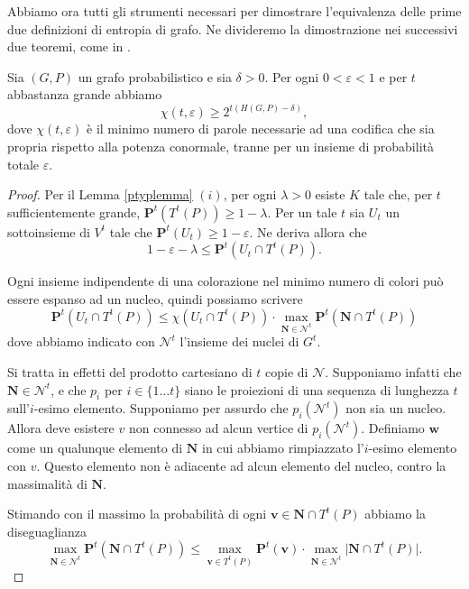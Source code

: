 Abbiamo ora tutti gli strumenti necessari per dimostrare l'equivalenza delle prime due definizioni di entropia di grafo. Ne divideremo la dimostrazione nei successivi due teoremi, come in \cite{Korner1973}. 
\begin{theorem}
  [K\"orner] Sia \((G,P)\) un grafo probabilistico e sia \(\delta>0\). Per ogni \(0<\varepsilon<1\) e per \(t\) abbastanza grande abbiamo
  \[\chi(t,\varepsilon)\ge 2^{t(H(G,P)-\delta)},\]
  dove \(\chi(t, \varepsilon)\) è il minimo numero di parole necessarie ad una codifica che sia propria rispetto alla potenza conormale, tranne per un insieme di probabilità totale \(\varepsilon\). 
\end{theorem}
\begin{proof}
  Per il Lemma \ref{ptyplemma} \((i)\), per ogni \(\lambda>0\) esiste \(K\) tale che, per \(t\) sufficientemente grande, \(\mathbf{P}^t(T^t(P))\ge 1-\lambda\). Per un tale \(t\) sia \(U_{t}\) un sottoinsieme di \(V^t\) tale che \(\mathbf{P}^t(U_{t})\ge 1-\varepsilon\). Ne deriva allora che 
  \begin{equation}
    \label{eq:epsilonlambda} 1-\varepsilon-\lambda\le \mathbf{P}^t(U_{t}\cap T^t(P)). 
  \end{equation}
  
  Ogni insieme indipendente di una colorazione nel minimo numero di colori può essere espanso ad un nucleo, quindi possiamo scrivere 
  \begin{equation}
    \label{eq:expansion} \mathbf{P}^t(U_{t}\cap T^t(P))\le \chi(U_{t}\cap T^t(P))\cdot\max_{\mathbf{N}\in \mathcal{N}^t} \mathbf{P}^t(\mathbf{N}\cap T^t(P)) 
  \end{equation}
  dove abbiamo indicato con \(\mathcal{N}^t\) l'insieme dei nuclei di \(G^t\).
	
  Si tratta in effetti del prodotto cartesiano di \(t\) copie di \(\mathcal{N}\). Supponiamo infatti che \(\mathbf{N}\in \mathcal{N}^t\), e che \(p_i\) per \(i\in\{1\dots t\}\) siano le proiezioni di una sequenza di lunghezza \(t\) sull'\(i\)-esimo elemento. Supponiamo per assurdo che \(p_i(\mathcal{N}^t)\) non sia un nucleo. Allora deve esistere \(v\) non connesso ad alcun vertice di \(p_i(\mathcal{N}^t)\). Definiamo \(\mathbf{w}\) come un qualunque elemento di \(\mathbf{N}\) in cui abbiamo rimpiazzato l'\(i\)-esimo elemento con \(v\). Questo elemento non è adiacente ad alcun elemento del nucleo, contro la massimalità di \(\mathbf{N}\).
  
  Stimando con il massimo la probabilità di ogni \(\mathbf{v}\in \mathbf{N}\cap T^{t}(P)\) abbiamo la diseguaglianza 
  \begin{equation}
    \label{eq:maxmax} \max_{\mathbf{N}\in \mathcal{N}^t} \mathbf{P}^t(\mathbf{N}\cap T^t(P))\le \max_{\mathbf{v}\in T^{t}(P)} \mathbf{P}^t(\mathbf{v})\cdot \max_{\mathbf{N}\in \mathcal{N}^t} \big\vert \mathbf{N}\cap T^t(P) \big\vert. 
  \end{equation}
	

\end{proof}
